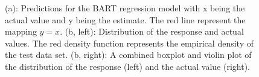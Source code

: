 \documentclass[
]{article}
\begin{document}
\begin{figure}[h]
    \centering
    \qquad
    \caption{(a): Predictions for the BART regression model with x being the actual value and y being the estimate. The red line represent the mapping $y=x$. (b, left): Distribution of the response and actual values. The red density function represents the empirical density of the test data set. (b, right): A combined boxplot and violin plot of the distribution of the response (left) and the actual value (right).}
\end{figure}
\end{document}
